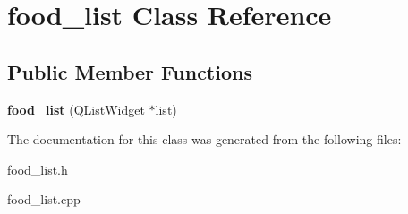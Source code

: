 \hypertarget{classfood__list}{}\section{food\+\_\+list Class Reference}
\label{classfood__list}
\subsection*{Public Member Functions}
\begin{DoxyCompactItemize}
\item 
{\bfseries food\+\_\+list} (Q\+List\+Widget $\ast$list)\hypertarget{classfood__list_a04af633e55be858e07c281583558ebc8}{}\label{classfood__list_a04af633e55be858e07c281583558ebc8}

\end{DoxyCompactItemize}


The documentation for this class was generated from the following files\+:\begin{DoxyCompactItemize}
\item 
food\+\_\+list.\+h\item 
food\+\_\+list.\+cpp\end{DoxyCompactItemize}
